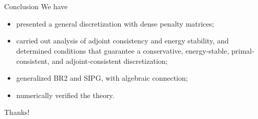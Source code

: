\documentclass{beamer}
\begin{document}
\section*{}
\begin{frame}{Conclusion}
      We have
      \begin{itemize}
          \item presented a general discretization with dense penalty matrices;
          \item carried out analysis of adjoint consistency and energy stability, and
          determined conditions that guarantee a conservative, energy-stable,
          primal-consistent, and adjoint-consistent discretization;
          \item generalized BR2 and SIPG, with algebraic connection;
          \item numerically verified the theory.
      \end{itemize}
\end{frame}

\begin{frame}
    \Huge\centering
    Thanks!
\end{frame}

%    
%    
\end{document}
